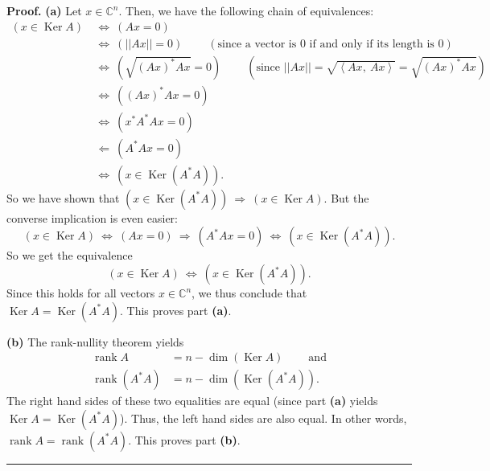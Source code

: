 \documentclass[numbers=enddot,12pt,final,onecolumn,notitlepage]{scrartcl}%
\numberwithin{exer}{subsection}
\theoremstyle{definition}
\newenvironment{proof}[1][Proof]{\noindent\textbf{#1.} }{\ \rule{0.5em}{0.5em}}
\begin{document}
\begin{proof}
\textbf{(a)} Let $x\in\mathbb{C}^{n}$. Then, we have the following chain of
equivalences:%
\begin{align*}
\left(  x\in\operatorname*{Ker}A\right)  \   & \Longleftrightarrow\ \left(
Ax=0\right)  \\
& \Longleftrightarrow\ \left(  \left\vert \left\vert Ax\right\vert \right\vert
=0\right)  \ \ \ \ \ \ \ \ \ \ \left(  \text{since a vector is }0\text{ if and
only if its length is }0\right)  \\
& \Longleftrightarrow\ \left(  \sqrt{\left(  Ax\right)  ^{\ast}Ax}=0\right)
\ \ \ \ \ \ \ \ \ \ \left(  \text{since }\left\vert \left\vert Ax\right\vert
\right\vert =\sqrt{\left\langle Ax,\ Ax\right\rangle }=\sqrt{\left(
Ax\right)  ^{\ast}Ax}\right)  \\
& \Longleftrightarrow\ \left(  \left(  Ax\right)  ^{\ast}Ax=0\right)  \\
& \Longleftrightarrow\ \left(  x^{\ast}A^{\ast}Ax=0\right)  \\
& \Longleftarrow\ \left(  A^{\ast}Ax=0\right)  \\
& \Longleftrightarrow\ \left(  x\in\operatorname*{Ker}\left(  A^{\ast
}A\right)  \right)  .
\end{align*}
So we have shown that $\left(  x\in\operatorname*{Ker}\left(  A^{\ast
}A\right)  \right)  \ \Longrightarrow\ \left(  x\in\operatorname*{Ker}%
A\right)  $. But the converse implication is even easier:%
\[
\left(  x\in\operatorname*{Ker}A\right)  \ \Longleftrightarrow\ \left(
Ax=0\right)  \ \Longrightarrow\ \left(  A^{\ast}Ax=0\right)
\ \Longleftrightarrow\ \left(  x\in\operatorname*{Ker}\left(  A^{\ast
}A\right)  \right)  .
\]
So we get the equivalence%
\[
\left(  x\in\operatorname*{Ker}A\right)  \ \Longleftrightarrow\ \left(
x\in\operatorname*{Ker}\left(  A^{\ast}A\right)  \right)  .
\]
Since this holds for all vectors $x\in\mathbb{C}^{n}$, we thus conclude that
$\operatorname*{Ker}A=\operatorname*{Ker}\left(  A^{\ast}A\right)  $. This
proves part \textbf{(a)}.

\textbf{(b)} The rank-nullity theorem yields%
\begin{align*}
\operatorname*{rank}A  & =n-\dim\left(  \operatorname*{Ker}A\right)
\ \ \ \ \ \ \ \ \ \ \text{and}\\
\operatorname*{rank}\left(  A^{\ast}A\right)    & =n-\dim\left(
\operatorname*{Ker}\left(  A^{\ast}A\right)  \right)  .
\end{align*}
The right hand sides of these two equalities are equal (since part
\textbf{(a)} yields $\operatorname*{Ker}A=\operatorname*{Ker}\left(  A^{\ast
}A\right)  $). Thus, the left hand sides are also equal. In other words,
$\operatorname*{rank}A=\operatorname*{rank}\left(  A^{\ast}A\right)  $. This
proves part \textbf{(b)}.
\end{proof}
\end{document}
